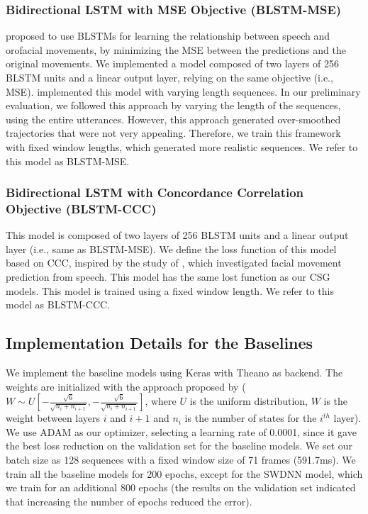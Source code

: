 \documentclass[10pt,journal,compsoc]{IEEEtran}
\begin{document}
\subsubsection{Bidirectional LSTM with MSE Objective (BLSTM-MSE)}
\label{ssec:baselinemse}

\citet{Fan_2016} proposed to use BLSTMs for learning the relationship between speech and orofacial movements, by minimizing the MSE between the predictions and the original movements. We implemented a model composed of two layers of 256 BLSTM units and a linear output layer, relying on the same objective (i.e., MSE). \citet{Fan_2016} implemented this model with varying length sequences. In our preliminary evaluation, we followed this approach by varying the length of the sequences, using the entire utterances. However, this approach generated over-smoothed trajectories that were not very appealing. Therefore, we train this framework with fixed window lengths, which generated more realistic sequences. We refer to this model as BLSTM-MSE.

\subsubsection{Bidirectional LSTM with Concordance Correlation Objective (BLSTM-CCC)}
\label{ssec:baselineccc}

This model is composed of two layers of 256 BLSTM units and a linear output layer (i.e., same as BLSTM-MSE). We define the loss function of this model based on CCC, inspired by the study of \citet{Sadoughi_2017}, which investigated facial movement prediction from speech. This model has the same lost function as our CSG models. This model is trained using a fixed window length. We refer to this model as BLSTM-CCC.

\subsection{Implementation Details for the Baselines}
\label{ssec:ImplBase}

We implement the baseline models using Keras with Theano as backend. The weights are initialized with the approach proposed by  \citet{Glorot_2010} ($W \sim U\left[-\frac{\sqrt{6}}{\sqrt{n_i+n_{i+1}}}, -\frac{\sqrt{6}}{\sqrt{n_i+n_{i+1}}}\right]$, where $U$ is the uniform distribution, $W$ is the weight between layers $i$ and $i+1$ and $n_{i}$ is the number of states for the $i^{th}$ layer).  We use ADAM as our optimizer, selecting a learning rate of 0.0001, since it gave the best loss reduction on the validation set for the baseline models. We set our batch size as 128 sequences with a fixed window size of 71 frames (591.7ms). We train all the baseline models for 200 epochs, except for the SWDNN model, which we train for an additional 800 epochs (the results on the validation set indicated that increasing the number of epochs reduced the error).
\end{document}
